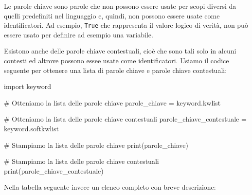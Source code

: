 \documentclass[
  letterpaper,
]{scrbook}
\newenvironment{Shaded}{\begin{snugshade}}{\end{snugshade}}
\newcommand{\BuiltInTok}[1]{\textcolor[rgb]{0.00,0.23,0.31}{#1}}
\newcommand{\CommentTok}[1]{\textcolor[rgb]{0.37,0.37,0.37}{#1}}
\newcommand{\ImportTok}[1]{\textcolor[rgb]{0.00,0.46,0.62}{#1}}
\newcommand{\NormalTok}[1]{\textcolor[rgb]{0.00,0.23,0.31}{#1}}
\newcommand{\OperatorTok}[1]{\textcolor[rgb]{0.37,0.37,0.37}{#1}}
\begin{document}
Le parole chiave sono parole che non possono essere usate per scopi
diversi da quelli predefiniti nel linguaggio e, quindi, non possono
essere usate come identificatori. Ad esempio, \texttt{True} che
rappresenta il valore logico di verità, non può essere usato per
definire ad esempio una variabile.

Esistono anche delle parole chiave contestuali, cioè che sono tali solo
in alcuni contesti ed altrove possono essee usate come identificatori.
Usiamo il codice seguente per ottenere una lista di parole chiave e
parole chiave contestuali:

\begin{Shaded}
\begin{Highlighting}[]
\ImportTok{import}\NormalTok{ keyword}

\CommentTok{\# Otteniamo la lista delle parole chiave}
\NormalTok{parole\_chiave }\OperatorTok{=}\NormalTok{ keyword.kwlist}

\CommentTok{\# Otteniamo la lista delle parole chiave contestuali}
\NormalTok{parole\_chiave\_contestuale }\OperatorTok{=}\NormalTok{ keyword.softkwlist}

\CommentTok{\# Stampiamo la lista delle parole chiave}
\BuiltInTok{print}\NormalTok{(parole\_chiave)}

\CommentTok{\# Stampiamo la lista delle parole chiave contestuali}
\BuiltInTok{print}\NormalTok{(parole\_chiave\_contestuale)}
\end{Highlighting}
\end{Shaded}

Nella tabella seguente invece un elenco completo con breve descrizione:
\end{document}
